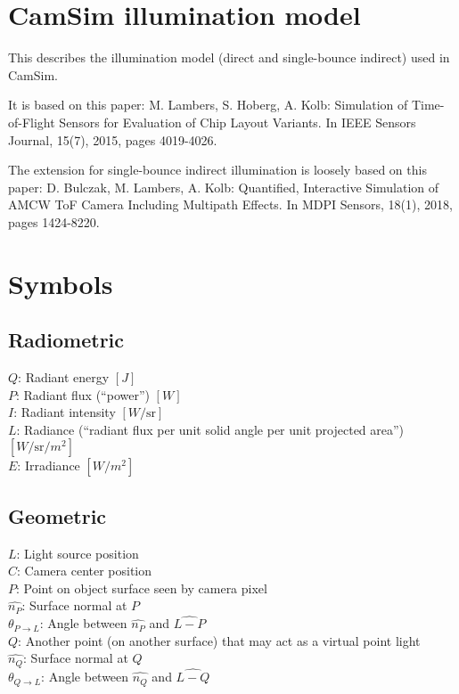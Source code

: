 \documentclass[a4paper,11pt,final]{article}
\begin{document}
\section*{CamSim illumination model}

This describes the illumination model (direct and single-bounce indirect) used
in CamSim.

It is based on this paper:
  M. Lambers, S. Hoberg, A. Kolb:
  Simulation of Time-of-Flight Sensors for Evaluation of Chip Layout Variants.
  In IEEE Sensors Journal, 15(7), 2015, pages 4019-4026.

The extension for single-bounce indirect illumination is loosely based on this paper:
  D. Bulczak, M. Lambers, A. Kolb:
  Quantified, Interactive Simulation of AMCW ToF Camera Including Multipath
  Effects.
  In MDPI Sensors, 18(1), 2018, pages 1424-8220.

\section{Symbols}

\subsection{Radiometric}

$Q$: Radiant energy $[J]$\\
$P$: Radiant flux (``power'') $[W]$\\
$I$: Radiant intensity $[W/\mathrm{sr}]$\\
$L$: Radiance (``radiant flux per unit solid angle per unit projected area'') $[W/\mathrm{sr}/m^2]$\\
$E$: Irradiance $[W/m^2]$

\subsection{Geometric}

$L$: Light source position\\
$C$: Camera center position\\
$P$: Point on object surface seen by camera pixel\\
$\widehat{n_P}$: Surface normal at $P$\\
$\theta_{P\rightarrow L}$: Angle between $\widehat{n_P}$ and $\widehat{L-P}$\\
$Q$: Another point (on another surface) that may act as a virtual point light\\
$\widehat{n_Q}$: Surface normal at $Q$\\
$\theta_{Q\rightarrow L}$: Angle between $\widehat{n_Q}$ and $\widehat{L-Q}$
\end{document}
